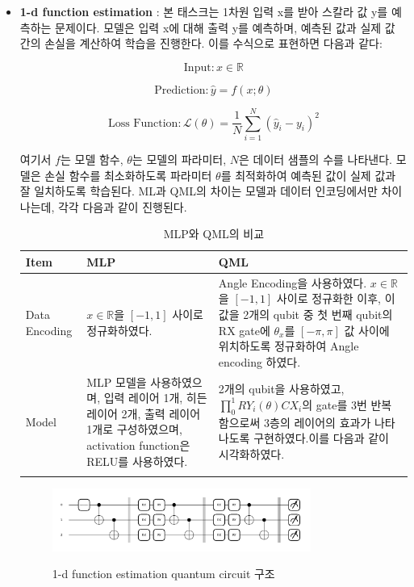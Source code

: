 \begin{itemize}
        \item \textbf{1-d function estimation} :
본 태스크는 1차원 입력 x를 받아 스칼라 값 y를 예측하는 문제이다. 모델은 입력 x에 대해 출력 y를 예측하며, 예측된 값과 실제 값 간의 손실을 계산하여 학습을 진행한다. 이를 수식으로 표현하면 다음과 같다:

\[
\text{Input}: x \in \mathbb{R}
\]

\[
\text{Prediction}: \hat{y} = f(x; \theta)
\]

\[
\text{Loss Function}: \mathcal{L}(\theta) = \frac{1}{N} \sum_{i=1}^{N} (\hat{y}_i - y_i)^2
\]

여기서 \(f\)는 모델 함수, \(\theta\)는 모델의 파라미터, \(N\)은 데이터 샘플의 수를 나타낸다. 모델은 손실 함수를 최소화하도록 파라미터 \(\theta\)를 최적화하여 예측된 값이 실제 값과 잘 일치하도록 학습된다. ML과 QML의 차이는 모델과 데이터 인코딩에서만 차이나는데, 각각 다음과 같이 진행된다.


\begin{table}[ht]
    \centering
    \begin{tabular}{ l||p{5.5cm}||p{5.5cm}}
    \Xhline{3\arrayrulewidth}
    \textbf{Item} & \textbf{MLP} & \textbf{QML} \\
    \hline
    Data Encoding & $x \in \mathbb{R}$을 $[-1, 1]$ 사이로 정규화하였다. &
    Angle Encoding을 사용하였다. $x \in \mathbb{R}$을 $[-1, 1]$ 사이로 정규화한 이후, 이 값을 2개의 qubit 중 첫 번째 qubit의 RX gate에 $\theta_x$를 $[-\pi, \pi]$ 값 사이에 위치하도록 정규화하여 Angle encoding 하였다. \\
    \hline
    Model & MLP 모델을 사용하였으며, 입력 레이어 1개, 히든 레이어 2개, 출력 레이어 1개로 구성하였으며, activation function은 RELU를 사용하였다. &
    2개의 qubit을 사용하였고, $\prod_{0}^{1} RY_i(\theta)CX_i$의 gate를 3번 반복함으로써 3층의 레이어의 효과가 나타나도록 구현하였다.이를 다음과 같이 시각화하였다.{fig:1d-image} \\
    \Xhline{3\arrayrulewidth}
    \end{tabular}
    \caption{MLP와 QML의 비교}
    \label{tab:mlp_qml_comparison_1d}
\end{table}

\begin{figure}[h]
    \centering
    \includegraphics[width=0.8\textwidth]{figs/pqc_1d}\
\caption{1-d function estimation quantum circuit 구조}
\label{fig:1d-image}
\end{figure}
\end{itemize}
\clearpage

